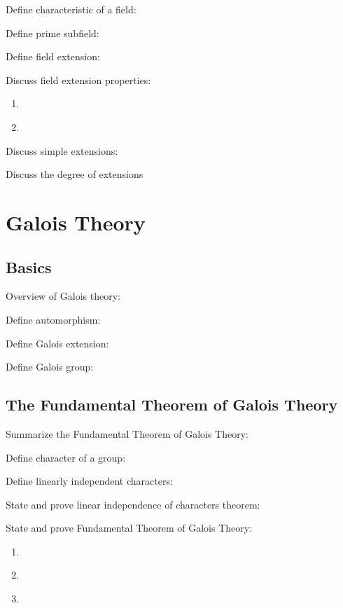 \documentclass[11pt, a4paper, oneside]{article}
\theoremstyle{plain}
\theoremstyle{definition}
\theoremstyle{example}
\begin{document}
Define characteristic of a field: \cite[Sec. 13.1]{dummit}

Define prime subfield: \cite[Sec. 13.1]{dummit}

Define field extension: \cite[Sec. 13.1]{dummit}

Discuss field extension properties:
\begin{enumerate}
\item \cite[Sec. 13.1]{dummit}
\item \cite[Ch. 4]{stewart}
\end{enumerate}

Discuss simple extensions: \cite[Ch. 5]{stewart}

Discuss the degree of extensions \cite[Ch. 6]{stewart}

\newpage
\section{Galois Theory}

\subsection{Basics}

Overview of Galois theory: \cite{galoiswiki}

Define automorphism: \cite[Sec. 14.1]{dummit}

Define Galois extension: \cite[Sec. 14.1]{dummit}

Define Galois group: \cite[14. 1]{dummit}

\subsection{The Fundamental Theorem of Galois Theory}

Summarize the Fundamental Theorem of Galois Theory: \cite{fundamentaltheoremwiki}

Define character of a group: \cite[Sec. 14.2]{dummit}

Define linearly independent characters: \cite[Sec. 14.2]{dummit}

State and prove linear independence of characters theorem: \cite[Sec. 14.2]{dummit}

State and prove Fundamental Theorem of Galois Theory:
\begin{enumerate}
\item \cite[Sec. 14.2]{dummit}
\item \cite[Ch. 9]{juliusz}
\item \cite[Ch. 12]{stewart}
\end{enumerate} 
\end{document}
